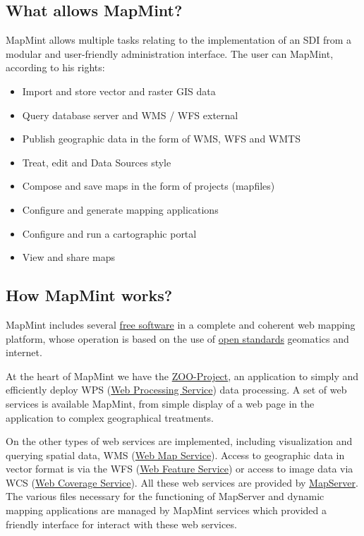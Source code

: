 \documentclass[letterpaper,10pt,english]{sphinxmanual}
\begin{document}
\subsection{What allows MapMint?}
\label{introduction/introduction:que-permet-mapmint}
MapMint allows multiple tasks relating to the implementation of an SDI from a modular and user-friendly administration interface. The user can MapMint, according to his rights:
\begin{itemize}
\item {} 
Import and store vector and raster GIS data

\item {} 
Query database server and WMS / WFS external

\item {} 
Publish geographic data in the form of WMS, WFS and WMTS

\item {} 
Treat, edit and Data Sources style

\item {} 
Compose and save maps in the form of projects (mapfiles)

\item {} 
Configure and generate mapping applications

\item {} 
Configure and run a cartographic portal

\item {} 
View and share maps

\end{itemize}


\subsection{How MapMint works?}
\label{introduction/introduction:comment-fonctionne-mapmint}
MapMint includes several \href{http://mapmint.com/en/Components}{free software} in a complete and coherent web mapping platform, whose operation is based on the use of \href{http://mapmint.com/en/Components}{open standards} geomatics and internet.

At the heart of MapMint we have the \href{http://zoo-project.org}{ZOO-Project}, an application to simply and efficiently deploy WPS (\href{http://www.opengeospatial.org/standards/wps}{Web Processing Service}) data processing. A set of web services is available MapMint, from simple display of a web page in the application to complex geographical treatments.

On the other types of web services are implemented, including visualization and querying spatial data, WMS (\href{http://www.opengeospatial.org/standards/wms}{Web Map Service}). Access to geographic data in vector format is via the WFS (\href{http://www.opengeospatial.org/standards/wfs}{Web Feature Service}) or access to image data via WCS (\href{http://www.opengeospatial.org/standards/wcs}{Web Coverage Service}). All these web services are provided by \href{http://mapserver.org}{MapServer}. The various files necessary for the functioning of MapServer and dynamic mapping applications are managed by MapMint services which provided a friendly interface for interact with these web services.
\end{document}
